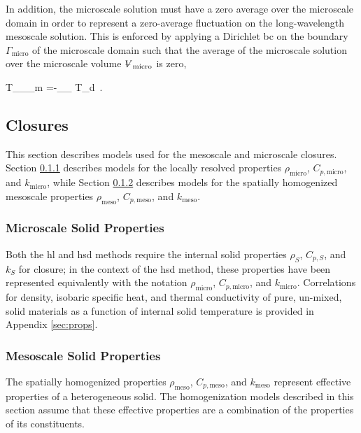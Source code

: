 In addition, the microscale solution must have a zero average over the microscale domain in order to represent a zero-average fluctuation on the long-wavelength mesoscale solution. This is enforced by applying a Dirichlet \gls{bc} on the boundary \(\Gamma_\text{micro}\) of the microscale domain such that the average of the microscale solution over the microscale volume \(\volume_\text{micro}\) is zero,

\beq
\label{eq:ConstantShiftMMD}
T_\rvert_{\Gamma_m} =-\int_{\volume_} T_d\volume\ .
\eeq

\subsection{Closures}
\label{sec:ClosuresMesoMicro}

This section describes models used for the mesoscale and microscale closures. Section \ref{sec:micro_props} describes models for the locally resolved properties \(\rho_\text{micro}\), \(C_{p,\text{micro}}\), and \(k_\text{micro}\), while Section \ref{sec:meso_props} describes models for the spatially homogenized mesoscale properties \(\rho_\text{meso}\), \(C_{p,\text{meso}}\), and \(k_\text{meso}\).


\subsubsection{Microscale Solid Properties}
\label{sec:micro_props}

Both the \gls{hl} and \gls{hsd} methods require the internal solid properties \(\rho_S\), \(C_{p,S}\), and \(k_S\) for closure; in the context of the \gls{hsd} method, these properties have been represented equivalently with the notation \(\rho_\text{micro}\), \(C_{p,\text{micro}}\), and \(k_\text{micro}\). Correlations for density, isobaric specific heat, and thermal conductivity of pure, un-mixed, solid materials as a function of internal solid temperature is provided in Appendix \ref{sec:props}.

\subsubsection{Mesoscale Solid Properties}
\label{sec:meso_props}

The spatially homogenized properties \(\rho_\text{meso}\), \(C_{p,\text{meso}}\), and \(k_\text{meso}\) represent effective properties of a heterogeneous solid. The homogenization models described in this section assume that these effective properties are a combination of the properties of its constituents.

